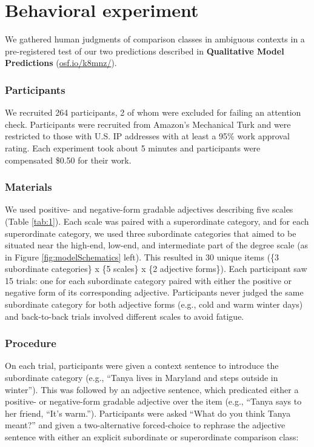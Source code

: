 \documentclass[doc]{apa6}
\begin{document}
\section{Behavioral experiment}

We gathered human judgments of comparison classes in ambiguous contexts
in a pre-registered test of our two predictions described in
\textbf{Qualitative Model Predictions} (\url{osf.io/k8mnz/}).

\subsubsection{Participants}

We recruited 264 participants, 2 of whom were excluded for failing an
attention check. Participants were recruited from Amazon's Mechanical
Turk and were restricted to those with U.S. IP addresses with at least a
95\% work approval rating. Each experiment took about 5 minutes and
participants were compensated \$0.50 for their work.

\subsubsection{Materials}

We used positive- and negative-form gradable adjectives describing five
scales (Table \ref{tab:1}). Each scale was paired with a superordinate
category, and for each superordinate category, we used three subordinate
categories that aimed to be situated near the high-end, low-end, and
intermediate part of the degree scale (as in Figure
\ref{fig:modelSchematics} left). This resulted in 30 unique items (\{3
subordinate categories\} x \{5 scales\} x \{2 adjective forms\}). Each
participant saw 15 trials: one for each subordinate category paired with
either the positive or negative form of its corresponding adjective.
Participants never judged the same subordinate category for both
adjective forms (e.g., cold and warm winter days) and back-to-back
trials involved different scales to avoid fatigue.


\subsubsection{Procedure}

On each trial, participants were given a context sentence to introduce
the subordinate category (e.g., ``Tanya lives in Maryland and
steps outside in winter''). This was followed by an adjective sentence,
which predicated either a positive- or negative-form gradable adjective
over the item (e.g., ``Tanya says to her friend, ``It's
warm.''). Participants were asked ``What do you think Tanya
meant?'' and given a two-alternative forced-choice to rephrase the
adjective sentence with either an explicit subordinate or superordinate
comparison class:
\end{document}
